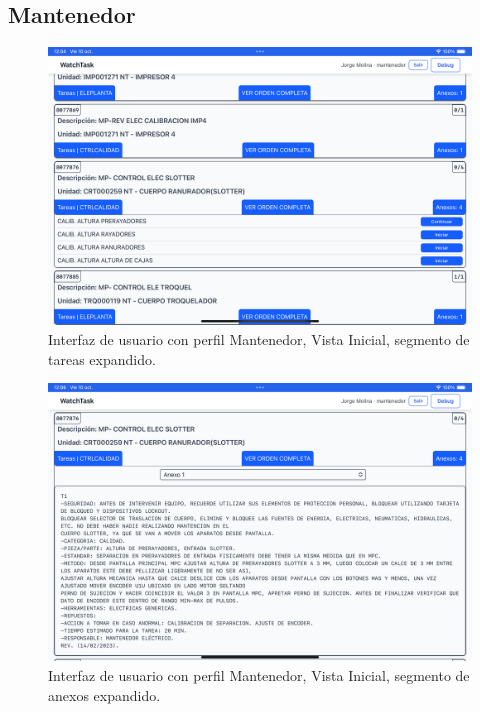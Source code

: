 \documentclass[12pt,a4paper]{report}
\begin{document}
\subsection*{Mantenedor}
\begin{figure}[h]
    \centering
    \includegraphics[width=1\textwidth]{data/Mantenedor_HOME_task.png}
    \caption[\,Mantenedor: Vista inicial (tareas)]{Interfaz de usuario con perfil Mantenedor, Vista Inicial, segmento de tareas expandido.}
    \label{fig:[Mantenedor_HOME_task]}
\end{figure}
\begin{figure}[h]
    \centering
    \includegraphics[width=1\textwidth]{data/Mantenedor_HOME_anexo.png}
    \caption[\,Mantenedor: Vista inicial (anexos)]{Interfaz de usuario con perfil Mantenedor, Vista Inicial, segmento de anexos expandido.}
    \label{fig:[Mantenedor_HOME_anexo]}
\end{figure}
\end{document}
